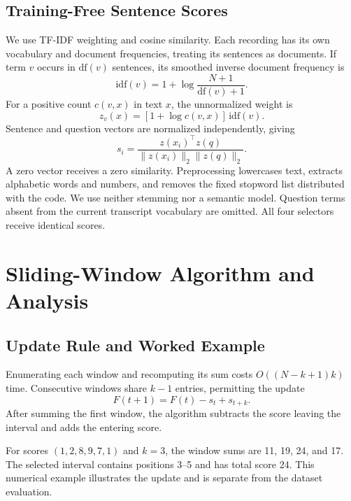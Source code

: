 \documentclass[10pt,journal,compsoc]{IEEEtran}
\begin{document}
\subsection{Training-Free Sentence Scores}
We use TF-IDF weighting and cosine similarity\cite{manning2008ir}. Each recording has its own vocabulary and document frequencies, treating its sentences as documents. If term $v$ occurs in $\mathrm{df}(v)$ sentences, its smoothed inverse document frequency is
\begin{equation}
 \mathrm{idf}(v)=1+\log\frac{N+1}{\mathrm{df}(v)+1}.
\end{equation}
For a positive count $c(v,x)$ in text $x$, the unnormalized weight is
\begin{equation}
 z_v(x)=[1+\log c(v,x)]\,\mathrm{idf}(v).
\end{equation}
Sentence and question vectors are normalized independently, giving
\begin{equation}
 s_i=\frac{z(x_i)^\top z(q)}{\|z(x_i)\|_2\|z(q)\|_2}.
 \label{eq:score}
\end{equation}
A zero vector receives a zero similarity. Preprocessing lowercases text, extracts alphabetic words and numbers, and removes the fixed stopword list distributed with the code. We use neither stemming nor a semantic model. Question terms absent from the current transcript vocabulary are omitted. All four selectors receive identical scores.

\section{Sliding-Window Algorithm and Analysis}
\subsection{Update Rule and Worked Example}
Enumerating each window and recomputing its sum costs $O((N-k+1)k)$ time. Consecutive windows share $k-1$ entries, permitting the update
\begin{equation}
 F(t+1)=F(t)-s_t+s_{t+k}.
 \label{eq:update}
\end{equation}
After summing the first window, the algorithm subtracts the score leaving the interval and adds the entering score.

For scores $(1,2,8,9,7,1)$ and $k=3$, the window sums are 11, 19, 24, and 17. The selected interval contains positions 3--5 and has total score 24. This numerical example illustrates the update and is separate from the dataset evaluation.
\end{document}

